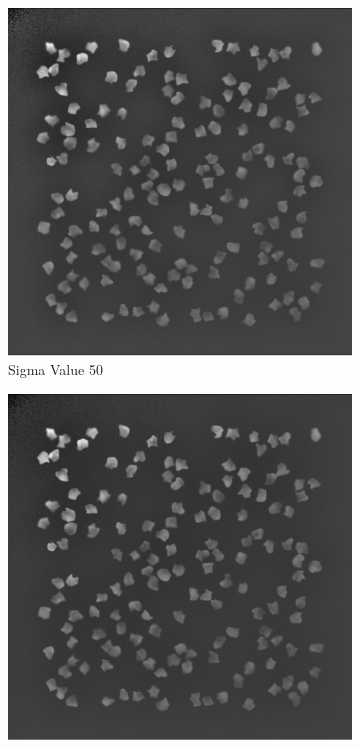 \documentclass[%
	a4paper, %
	12pt, %
	english, %
	bibtotoc %
]{scrartcl}
\begin{document}
\begin{figure}[h!]
    \centering
    \begin{subfigure}{0.3\linewidth}
        \includegraphics[width=\linewidth]{latex-template-ss24/images/50_Gaussian_blur.png}
        \caption{Sigma Value 50}
        \label{fig:figure50gaussianblur}
    \end{subfigure}
    \begin{subfigure}{0.3\linewidth}
        \includegraphics[width=\linewidth]{latex-template-ss24/images/75_Gaussian_blur.png}

\end{subfigure}
\end{figure}
\end{document}
